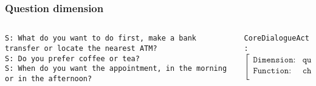 \documentclass[11pt]{beamer}
\begin{document}
\begin{frame}[fragile]
\frametitle{Question dimension}
	\begin{center}
	\end{center}
	\vspace{15pt}
	\begin{columns}
		\begin{column}{0.60\textwidth}
		\small
		{\color{red} 
			\texttt{S: What do you want to do first, make a bank transfer or locate the nearest ATM?}\\
			\vspace{10pt}
			\texttt{S: Do you prefer coffee or tea?}\\
			\vspace{10pt}
			\texttt{S: When do you want the appointment, in the morning or in the afternoon?}\\
		}
		\end{column}
		\begin{column}{0.40\textwidth}
			\footnotesize
			\texttt{CoreDialogueAct:} \\
				\vspace{10pt}
				$\begin{bmatrix}
						\texttt{Dimension:}    & \texttt{question}\\ 
						\texttt{Function:}     & \texttt{choice}\\ 
				\end{bmatrix}$
		\end{column}
	\end{columns}
\end{frame}
\end{document}
